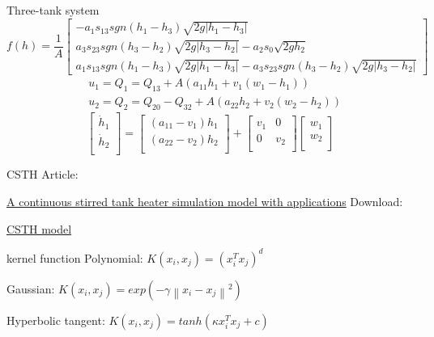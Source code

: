 \documentclass[10pt]{beamer}
\newcommand{\norm}[1]{\left\lVert#1\right\rVert}
\begin{document}
\begin{frame}{Three-tank system}
        \begin{equation} \nonumber
    f(h) =
     \frac{1}{A}
    \begin{bmatrix}
    -a_1s_{13}sgn(h_1-h_3)\sqrt{2g|h_1-h_3|} \\  
    a_3s_{23}sgn(h_3-h_2)\sqrt{2g|h_3-h_2|}-a_2s_0\sqrt{2gh_2} \\
    a_1s_{13}sgn(h_1-h_3)\sqrt{2g|h_1-h_3|}-a_3s_{23}sgn(h_3-h_2)\sqrt{2g|h_3-h_2|}
    \end{bmatrix}
    \end{equation}
    \begin{equation} \nonumber
  \begin{aligned}
&  u_1 = Q_1 = Q_{13} + A(a_{11}h_1+v_1(w_1-h_1)) \\
&  u_2 = Q_2 = Q_{20} - Q_{32} +A(a_{22}h_2+v_2(w_2-h_2))
  \end{aligned}
  \label{u1}
\end{equation}
\begin{equation} \nonumber
  \begin{bmatrix}
    \dot{h}_1 \\
    \dot{h}_2 \\
  \end{bmatrix}
  = 
  \begin{bmatrix}
    (a_{11}-v_1)h_1 \\
    (a_{22}-v_2)h_2 \\
  \end{bmatrix}
  +\begin{bmatrix}
    v_1 & 0\\
    0   & v_2 \\
  \end{bmatrix}
  \begin{bmatrix}
    w_1 \\
    w_2 \\
  \end{bmatrix}
\end{equation}
    \end{frame}
\begin{frame}{CSTH}
    Article: \par
      \href{https://www.sciencedirect.com/science/article/pii/S0959152407001126}{A continuous stirred tank heater simulation model with applications}
      Download: \par
        \href{http://personal-pages.ps.ic.ac.uk/~nina/CSTHSimulation/CSTHMaster.mdl}{CSTH model}
    \end{frame}
\begin{frame}{kernel function}
    Polynomial: $K(x_i,x_j) = (x_i^Tx_j)^d$ \par
    Gaussian:  $K(x_i,x_j) = exp(-\gamma \norm{x_i-x_j}^2)$ \par
    Hyperbolic tangent: $K(x_i,x_j) = tanh(\kappa x_i^Tx_j+c)$
    \end{frame}
\end{document}
